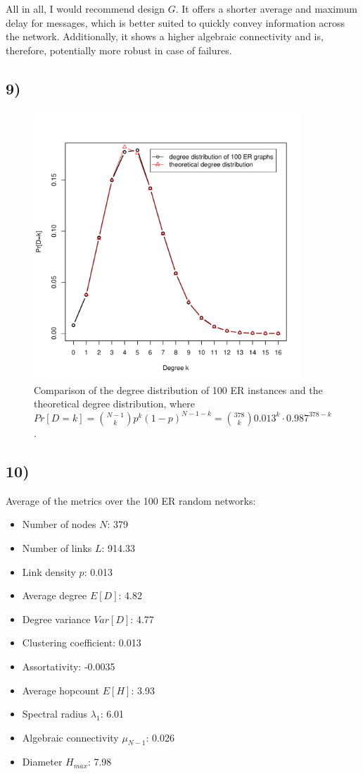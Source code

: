 \documentclass{article}
\begin{document}
\vspace*{0.5em}
\noindent All in all, I would recommend design $G$. It offers a
shorter average and maximum delay for messages, which is better suited
to quickly convey information across the network.  Additionally, it
shows a higher algebraic connectivity and is, therefore, potentially
more robust in case of failures. 

\subsection*{9)}

\begin{figure}[H]
  \centering
  \includegraphics[width=0.9\textwidth]{er_degree_distribution}
  \caption{Comparison of the degree distribution of 100 ER instances
    and the theoretical degree distribution, where $Pr[D=k] =
    \binom{N-1}{k}p^k(1-p)^{N-1-k}=\binom{378}{k}0.013^k\cdot0.987^{378-k}$.}
\end{figure}


\subsection*{10)}
Average of the metrics over the 100 ER random networks:
\begin{itemize}
 \item Number of nodes $N$: 379
 \item Number of links $L$: 914.33
 \item Link density $p$: 0.013
 \item Average degree $E[D]$: 4.82
 \item Degree variance $Var[D]$: 4.77
 \item Clustering coefficient: 0.013
 \item Assortativity: -0.0035
 \item Average hopcount $E[H]$: 3.93
 \item Spectral radius $\lambda_1$: 6.01
 \item Algebraic connectivity $\mu_{N-1}$: 0.026
 \item Diameter $H_{max}$: 7.98
\end{itemize}
\end{document}

